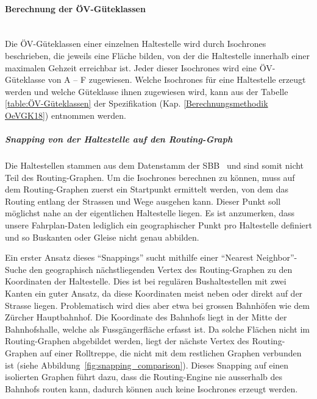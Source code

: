 \paragraph{Berechnung der ÖV-Güteklassen}~\\
Die \acs{ÖV}-Güteklassen einer einzelnen Haltestelle wird durch \glspl{Isochrone} beschrieben, die jeweils eine Fläche bilden, von der die Haltestelle innerhalb einer maximalen Gehzeit erreichbar ist.
Jeder dieser \glspl{Isochrone} wird eine \acs{ÖV}-Güteklasse von A -- F zugewiesen.
Welche \glspl{Isochrone} für eine Haltestelle erzeugt werden und welche Güteklasse ihnen zugewiesen wird, kann aus der Tabelle \ref{table:ÖV-Güteklassen} der Spezifikation (Kap. \ref{Berechnungsmethodik OeVGK18}) entnommen werden.

\subparagraph{Snapping von der Haltestelle auf den Routing-Graph}
Die Haltestellen stammen aus dem Datenstamm der SBB~\cite{sbb_hafas_spec} und sind somit nicht Teil des Routing-Graphen. 
Um die \glspl{Isochrone} berechnen zu können, muss auf dem Routing-Graphen zuerst ein Startpunkt ermittelt werden, von dem das Routing entlang der Strassen und Wege ausgehen kann.
Dieser Punkt soll möglichst nahe an der eigentlichen Haltestelle liegen.
Es ist anzumerken, dass unsere Fahrplan-Daten lediglich ein geographischer Punkt pro Haltestelle definiert und so Buskanten oder Gleise nicht genau abbilden.

Ein erster Ansatz dieses "`Snappings"' sucht mithilfe einer "`Nearest Neighbor"'-Suche den geographisch nächstliegenden Vertex des Routing-Graphen zu den Koordinaten der Haltestelle.
Dies ist bei regulären Bushaltestellen mit zwei Kanten ein guter Ansatz, da diese Koordinaten meist neben oder direkt auf der Strasse liegen.
Problematisch wird dies aber etwa bei grossen Bahnhöfen wie dem Zürcher Hauptbahnhof.
Die Koordinate des Bahnhofs liegt in der Mitte der Bahnhofshalle, welche als Fussgängerfläche erfasst ist.
Da solche Flächen nicht im Routing-Graphen abgebildet werden, liegt der nächste Vertex des Routing-Graphen auf einer Rolltreppe, die nicht mit dem restlichen Graphen verbunden ist (siehe Abbildung~\ref{fig:snapping_comparison}).
Dieses Snapping auf einen isolierten Graphen führt dazu, dass die Routing-Engine nie ausserhalb des Bahnhofs routen kann, dadurch können auch keine \glspl{Isochrone} erzeugt werden.

